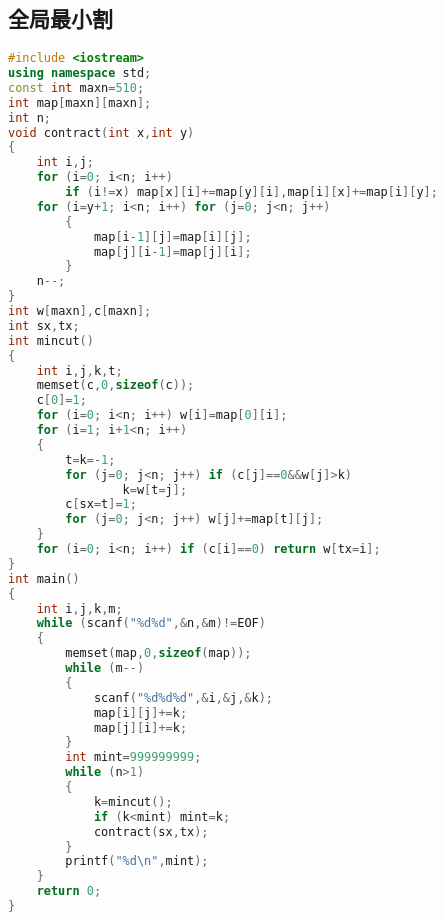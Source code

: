 \subsection{全局最小割}
	\begin{lstlisting}[language=c++]
#include <iostream>
using namespace std;
const int maxn=510;
int map[maxn][maxn];
int n;
void contract(int x,int y)
{
	int i,j;
	for (i=0; i<n; i++)
		if (i!=x) map[x][i]+=map[y][i],map[i][x]+=map[i][y];
	for (i=y+1; i<n; i++) for (j=0; j<n; j++)
		{
			map[i-1][j]=map[i][j];
			map[j][i-1]=map[j][i];
		}
	n--;
}
int w[maxn],c[maxn];
int sx,tx;
int mincut()
{
	int i,j,k,t;
	memset(c,0,sizeof(c));
	c[0]=1;
	for (i=0; i<n; i++) w[i]=map[0][i];
	for (i=1; i+1<n; i++)
	{
		t=k=-1;
		for (j=0; j<n; j++) if (c[j]==0&&w[j]>k)
				k=w[t=j];
		c[sx=t]=1;
		for (j=0; j<n; j++) w[j]+=map[t][j];
	}
	for (i=0; i<n; i++) if (c[i]==0) return w[tx=i];
}
int main()
{
	int i,j,k,m;
	while (scanf("%d%d",&n,&m)!=EOF)
	{
		memset(map,0,sizeof(map));
		while (m--)
		{
			scanf("%d%d%d",&i,&j,&k);
			map[i][j]+=k;
			map[j][i]+=k;
		}
		int mint=999999999;
		while (n>1)
		{
			k=mincut();
			if (k<mint) mint=k;
			contract(sx,tx);
		}
		printf("%d\n",mint);
	}
	return 0;
}
	\end{lstlisting}